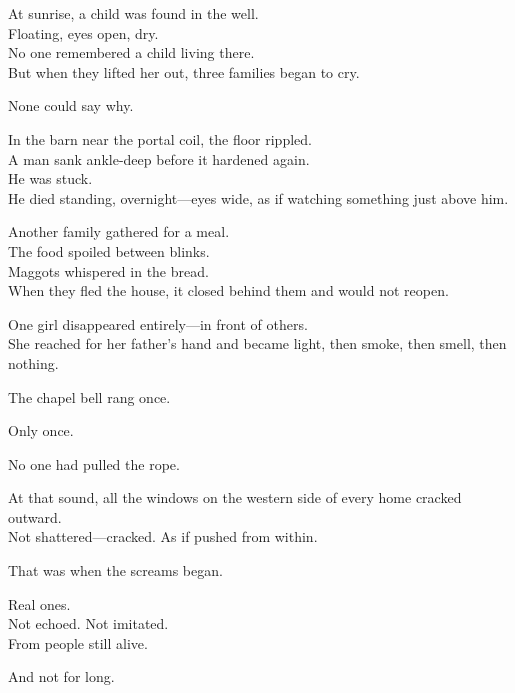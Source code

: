 \documentclass[9pt]{article}
\begin{document}
\vspace{0.5em}
At sunrise, a child was found in the well.\\
Floating, eyes open, dry.\\
No one remembered a child living there.\\
But when they lifted her out, three families began to cry.

\vspace{0.5em}
None could say why.

\vspace{0.5em}
In the barn near the portal coil, the floor rippled.\\
A man sank ankle-deep before it hardened again.\\
He was stuck.\\
He died standing, overnight---eyes wide, as if watching something just above him.

\vspace{0.5em}
Another family gathered for a meal.\\
The food spoiled between blinks.\\
Maggots whispered in the bread.\\
When they fled the house, it closed behind them and would not reopen.

\vspace{0.5em}
One girl disappeared entirely---in front of others.\\
She reached for her father’s hand and became light, then smoke, then smell, then nothing.

\vspace{0.5em}
The chapel bell rang once.

\vspace{0.5em}
Only once.

\vspace{0.5em}
No one had pulled the rope.

\vspace{0.5em}
At that sound, all the windows on the western side of every home cracked outward.\\
Not shattered---cracked. As if pushed from within.

\vspace{0.5em}
That was when the screams began.

\vspace{0.5em}
Real ones.\\
Not echoed. Not imitated.\\
From people still alive.

\vspace{0.5em}
And not for long.
\end{document}
